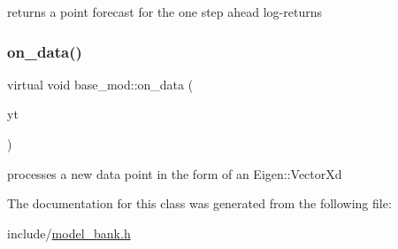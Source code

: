 returns a point forecast for the one step ahead log-\/returns 

\mbox{\label{classbase__mod_a347fb7e0a320a2c29cadfdd9d084c311}} 
\subsubsection{\texorpdfstring{on\+\_\+data()}{on\_data()}}
{\footnotesize\ttfamily virtual void base\+\_\+mod\+::on\+\_\+data (\begin{DoxyParamCaption}\item[{const Eigen\+::\+Vector\+Xd \&}]{yt }\end{DoxyParamCaption})\hspace{0.3cm}{\ttfamily [pure virtual]}}



processes a new data point in the form of an Eigen\+::\+Vector\+Xd 



The documentation for this class was generated from the following file\+:\begin{DoxyCompactItemize}
\item 
include/\hyperlink{model__bank_8h}{model\+\_\+bank.\+h}\end{DoxyCompactItemize}
